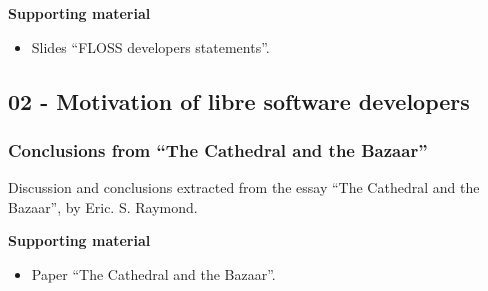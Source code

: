 \documentclass[a4paper]{article}
\begin{document}
\textbf{Supporting material}

\begin{itemize}
\item Slides ``FLOSS developers statements''.
\end{itemize}

% 
% 
% 
% 
\subsection{02 - Motivation of libre software developers}


\subsubsection{Conclusions from ``The Cathedral and the Bazaar''}
\label{sub:cathedral-bazaar}

Discussion and conclusions extracted from the essay ``The Cathedral and the Bazaar'', by Eric. S. Raymond.

\textbf{Supporting material}

\begin{itemize}
\item Paper ``The Cathedral and the Bazaar''.
\end{itemize}
\end{document}

